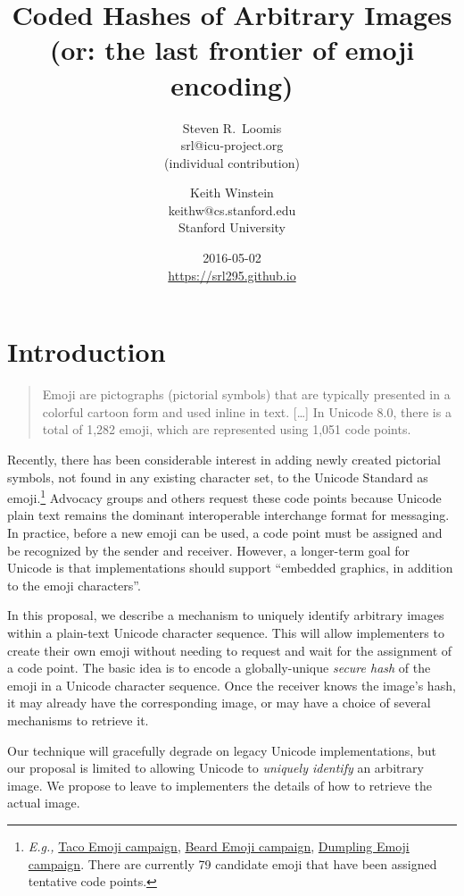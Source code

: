 \documentclass[12pt]{article}
\title{Coded Hashes of Arbitrary Images\\\normalsize \sf (or: the last frontier of emoji encoding)}
\author{
Steven R.~Loomis\\
\small srl@icu-project.org\\
\small (individual contribution)\\
\and
Keith Winstein\\
\small keithw@cs.stanford.edu\\
\small Stanford University\\
}
\date{2016-05-02\\\small\url{https://srl295.github.io}}                                           %
\begin{document}
\maketitle

\section{Introduction}

\begin{quote}
Emoji are pictographs (pictorial symbols) that are typically presented
in a colorful cartoon form and used inline in text. [\ldots] In
Unicode 8.0, there is a total of 1,282 emoji, which are represented
using 1,051 code points.\autocite{UTR51}
\end{quote}

Recently, there has been considerable interest in adding newly created
pictorial symbols, not found in any existing character set, to the
Unicode Standard as emoji.\footnote{\textit{E.g.,}
  \href{https://www.change.org/p/unicode-consortium-the-taco-emoji-needs-to-happen-aeb4ebc7-a323-441d-90b9-20b90c83a8c6}{Taco
    Emoji campaign}, \href{http://www.beardemoji.com/}{Beard Emoji
    campaign}, \href{http://www.dumplingemoji.org}{Dumpling Emoji
    campaign}. There are currently 79 candidate emoji that have been
  assigned tentative code points.} Advocacy groups and others request
these code points because Unicode plain text remains the dominant
interoperable interchange format for messaging. In practice, before a
new emoji can be used, a code point must be assigned and be recognized
by the sender and receiver. However, a longer-term goal for Unicode is
that implementations should support ``embedded graphics, in addition
to the emoji characters''\autocite[Section 8, ``Longer Term
  Solutions'']{UTR51}.

In this proposal, we describe a mechanism to uniquely identify
arbitrary images within a plain-text Unicode character sequence. This
will allow implementers to create their own emoji without needing to
request and wait for the assignment of a code point. The basic idea is
to encode a globally-unique \emph{secure hash} of the emoji in a
Unicode character sequence. Once the receiver knows the image's hash,
it may already have the corresponding image, or may have a choice of
several mechanisms to retrieve it.

Our technique will gracefully degrade on legacy Unicode
implementations, but our proposal is limited to allowing Unicode to
\emph{uniquely identify} an arbitrary image. We propose to leave to
implementers the details of how to retrieve the actual image.
\end{document}
